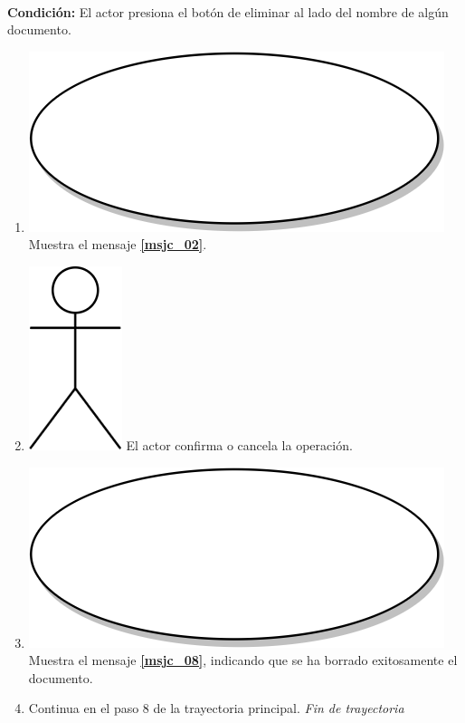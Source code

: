 \textbf{} \\
\textbf{Condición:} El actor presiona el botón de eliminar al lado del nombre de algún documento.\\
 \begin{enumerate}[label=A\arabic*]
    \item {\includegraphics[scale=.05]{Capitulo3/img/proceso.png} Muestra el mensaje \textbf{\ref{msjc_02}}.}
    \item {\includegraphics[scale=.1]{Capitulo3/img/actor.png} El actor confirma o cancela la operación.}
        \item {\includegraphics[scale=.05]{Capitulo3/img/proceso.png} Muestra el mensaje \textbf{\ref{msjc_08}}, indicando que se ha borrado exitosamente el documento.}
    \item {Continua en el paso 8  de la trayectoria principal.}
    \textit{Fin de trayectoria} \\
\end{enumerate}

